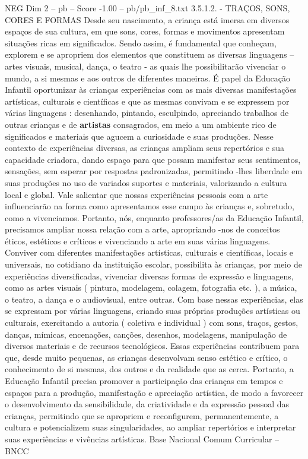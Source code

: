 \begin{textsample}{NEG Dim 2 – pb – Score -1.00 – pb/pb\_inf\_8.txt}  \label{ex:f2_neg_014}
3.5.1.2. - TRAÇOS, SONS, CORES E FORMAS Desde seu nascimento, a criança está imersa em diversos espaços de sua cultura, em que sons, cores, formas e movimentos apresentam situações ricas em significados.
Sendo assim, é fundamental que conheçam, explorem e se apropriem dos elementos que constituem as diversas linguagens – artes visuais, musical, dança, o teatro - as quais lhe possibilitarão vivenciar o mundo, a si mesmas e aos outros de diferentes maneiras.
É papel da Educação Infantil oportunizar às crianças experiências com as mais diversas manifestações artísticas, culturais e científicas e que as mesmas convivam e se expressem por várias linguagens : desenhando, pintando, esculpindo, apreciando trabalhos de outras crianças e de \textbf{artistas} consagrados, em meio a um ambiente rico de significados e materiais que agucem a curiosidade e suas produções.
Nesse contexto de experiências diversas, as crianças ampliam seus repertórios e sua capacidade criadora, dando espaço para que possam manifestar seus sentimentos, sensações, sem esperar por respostas padronizadas, permitindo -lhes liberdade em suas produções no uso de variados suportes e materiais, valorizando a cultura local e global.
Vale salientar que nossas experiências pessoais com a arte influenciarão na forma como apresentamos esse campo às crianças e, sobretudo, como a vivenciamos.
Portanto, nós, enquanto professores/as da Educação Infantil, precisamos ampliar nossa relação com a arte, apropriando -nos de conceitos éticos, estéticos e críticos e vivenciando a arte em suas várias linguagens.
Conviver com diferentes manifestações artísticas, culturais e científicas, locais e universais, no cotidiano da instituição escolar, possibilita às crianças, por meio de experiências diversificadas, vivenciar diversas formas de expressão e linguagens, como as artes visuais ( pintura, modelagem, colagem, fotografia etc. ), a música, o teatro, a dança e o audiovisual, entre outras.
Com base nessas experiências, elas se expressam por várias linguagens, criando suas próprias produções artísticas ou culturais, exercitando a autoria ( coletiva e individual ) com sons, traços, gestos, danças, mímicas, encenações, canções, desenhos, modelagens, manipulação de diversos materiais e de recursos tecnológicos.
Essas experiências contribuem para que, desde muito pequenas, as crianças desenvolvam senso estético e crítico, o conhecimento de si mesmas, dos outros e da realidade que as cerca.
Portanto, a Educação Infantil precisa promover a participação das crianças em tempos e espaços para a produção, manifestação e apreciação artística, de modo a favorecer o desenvolvimento da sensibilidade, da criatividade e da expressão pessoal das crianças, permitindo que se apropriem e reconfigurem, permanentemente, a cultura e potencializem suas singularidades, ao ampliar repertórios e interpretar suas experiências e vivências artísticas.
Base Nacional Comum Curricular – BNCC

\end{textsample}
